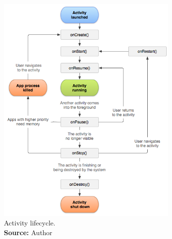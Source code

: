 \begin{figure}[H]
\centering
\includegraphics[width=0.8\textwidth]{Figures/activity_lifecycle.png}
\caption{Activity lifecycle.\\\textbf{Source:} Author}
\label{android-activity}
\end{figure}

